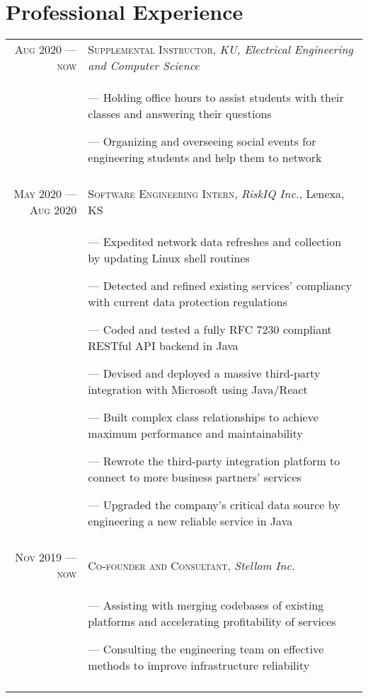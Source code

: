 \documentclass[letterpaper, 10pt]{article}
\begin{document}
\section{Professional Experience}
\begin{tabular}{r|p{12cm}}
	\textsc{Aug 2020 --- now}      & \textsc{Supplemental Instructor}, \emph{KU, Electrical Engineering and Computer Science}    \\&\footnotesize{
		--- Holding office hours to assist students with their classes and answering their questions

		--- Organizing and overseeing social events for engineering students and help them to network}                          \\\multicolumn{2}{c}{}\\

	\textsc{May 2020 --- Aug 2020} & \textsc{Software Engineering Intern}, \emph{RiskIQ Inc.}, Lenexa, KS                        \\&\footnotesize{
		--- Expedited network data refreshes and collection by updating Linux shell routines

		--- Detected and refined existing services' compliancy with current data protection regulations

                --- Coded and tested a fully RFC 7230 compliant RESTful API backend in Java

		--- Devised and deployed a massive third-party integration with Microsoft using Java/React

                --- Built complex class relationships to achieve maximum performance and maintainability

                --- Rewrote the third-party integration platform to connect to more business partners' services

                --- Upgraded the company's critical data source by engineering a new reliable service in Java
	}                                                                                                                            \\\multicolumn{2}{c}{}\\

	\textsc{Nov 2019 --- now}      & \textsc{Co-founder and Consultant}, \emph{Stellom Inc.}                                                    \\&\footnotesize{
		--- Assisting with merging codebases of existing platforms and accelerating profitability of services

		--- Consulting the engineering team on effective methods to improve infrastructure reliability
	}                                                                                                                            \\\multicolumn{2}{c}{}\\


\end{tabular}
\end{document}
